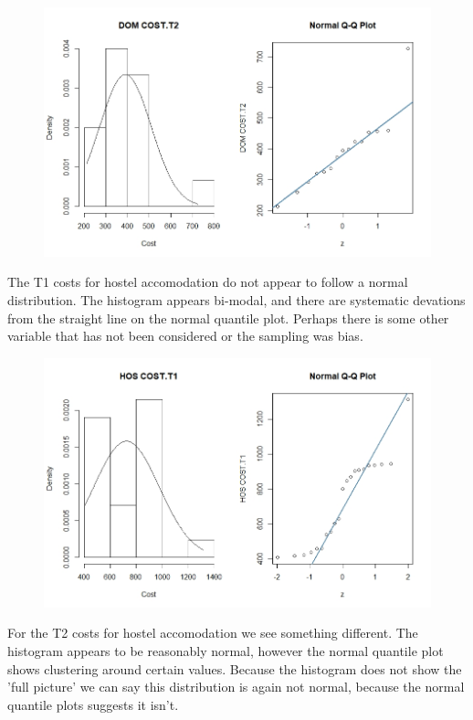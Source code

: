 \documentclass[]{article}
\begin{document}
\begin{figure}[H]
\centering
\includegraphics[width=12cm]{RStudio/jpeg/Norm_DOM_T2.jpeg}
\end{figure}
\newpage
The T1 costs for hostel accomodation do not appear to follow a normal distribution. The histogram appears bi-modal, and there are systematic devations from the straight line on the normal quantile plot. Perhaps there is some other variable that has not been considered or the sampling was bias.
\begin{figure}[H]
\centering
\includegraphics[width=12cm]{RStudio/jpeg/Norm_HOS_T1.jpeg}
\end{figure}
For the T2 costs for hostel accomodation we see something different. The histogram appears to be reasonably normal, however the normal quantile plot shows clustering around certain values. Because the histogram does not show the 'full picture' we can say this distribution is again not normal, because the normal quantile plots suggests it isn't.
\end{document}
